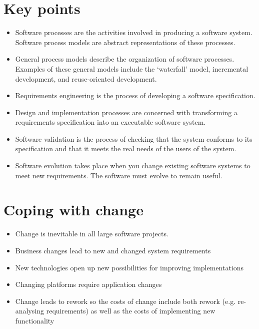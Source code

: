 \section{Key points}
\begin{itemize}

\item Software processes are the activities involved in producing a software system. Software process models are abstract representations of these processes.

\item General process models describe the organization of software processes. Examples of these general models include the ‘waterfall’ model, incremental development, and reuse-oriented development.

\item Requirements engineering is the process of developing a software specification.

\item Design and implementation processes are concerned with transforming a requirements specification into an executable software system.

\item Software validation is the process of checking that the system conforms to its specification and that it meets the real needs of the users of the system.

\item Software evolution takes place when you change existing software systems to meet new requirements. The software must evolve to remain useful.
\end{itemize}

\section{Coping with change}
\begin{itemize}
\item Change is inevitable in all large software projects.

\item Business changes lead to new and changed system requirements
\item New technologies open up new possibilities for improving implementations
\item Changing platforms require application changes

\item Change leads to rework so the costs of change include both rework (e.g. re-analysing requirements) as well as the costs of implementing new functionality
\end{itemize}

